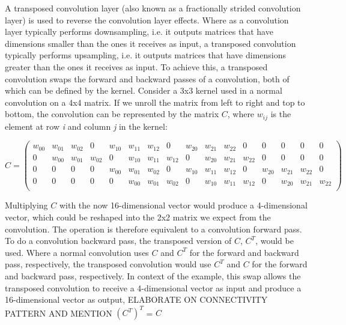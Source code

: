 A transposed convolution layer (also known as a fractionally strided convolution layer) is used to reverse the convolution layer effects. Where as a convolution layer typically performs downsampling, i.e. it outputs matrices that have dimensions smaller than the ones it receives as input, a transposed convolution typically performs upsampling, i.e. it outputs matrices that have dimensions greater than the ones it receives as input. To achieve this, a transposed convolution swaps the forward and backward passes of a convolution, both of which can be defined by the kernel. Consider a 3x3 kernel used in a normal convolution on a 4x4 matrix. If we unroll the matrix from left to right and top to bottom, the convolution can be represented by the matrix $C$, where \textit{$w_{ij}$} is the element at row \textit{i} and column \textit{j} in the kernel:

\[
    C = 
    \left(
    \begin{smallmatrix}
    \textit{$w_{00}$} & \textit{$w_{01}$} & \textit{$w_{02}$} & 0 & 
    \textit{$w_{10}$} & \textit{$w_{11}$} & \textit{$w_{12}$} & 0 & 
    \textit{$w_{20}$} & \textit{$w_{21}$} & \textit{$w_{22}$} & 0 & 
    0 & 0 & 0 & 0\\
    0 & \textit{$w_{00}$} & \textit{$w_{01}$} & \textit{$w_{02}$} & 
    0 & \textit{$w_{10}$} & \textit{$w_{11}$} & \textit{$w_{12}$} & 
    0 & \textit{$w_{20}$} & \textit{$w_{21}$} & \textit{$w_{22}$} & 
    0 & 0 & 0 & 0\\
    0 & 0 & 0 & 0 & 
    \textit{$w_{00}$} & \textit{$w_{01}$} & \textit{$w_{02}$} & 0 & 
    \textit{$w_{10}$} & \textit{$w_{11}$} & \textit{$w_{12}$} & 0 & 
    \textit{$w_{20}$} & \textit{$w_{21}$} & \textit{$w_{22}$} & 0\\
    0 & 0 & 0 & 0 & 
    0 & \textit{$w_{00}$} & \textit{$w_{01}$} & \textit{$w_{02}$} & 
    0 & \textit{$w_{10}$} & \textit{$w_{11}$} & \textit{$w_{12}$} & 
    0 & \textit{$w_{20}$} & \textit{$w_{21}$} & \textit{$w_{22}$}\\
    \end{smallmatrix}
    \right)
\]

Multiplying $C$ with the now 16-dimensional vector would produce a 4-dimensional vector, which could be reshaped into the 2x2 matrix we expect from the convolution. The operation is therefore equivalent to a convolution forward pass. To do a convolution backward pass, the transposed version of $C$, $C^T$, would be used. Where a normal convolution uses $C$ and $C^T$ for the forward and backward pass, respectively, the transposed convolution would use $C^T$ and $C$ for the forward and backward pass, respectively. In context of the example, this swap allows the transposed convolution to receive a 4-dimensional vector as input and produce a 16-dimensional vector as output, ELABORATE ON CONNECTIVITY PATTERN AND MENTION $(C^T)^T$ = $C$

